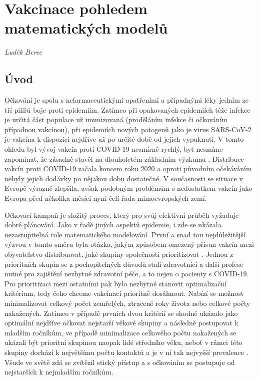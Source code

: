 \chapter{Vakcinace pohledem matematických modelů}
\label{Ucinnost_ockovani}

\textit{Luděk Berec}
\vspace{15mm}

\section*{Úvod}

Očkování je spolu s nefarmaceutickými opatřeními a případnými léky jedním ze tří pilířů boje proti epidemiím. Zatímco při opakovaných epidemiích téže infekce je určitá část populace už imunizovaná (proděláním infekce či očkováním případnou vakcínou), při epidemiích nových patogenů jako je virus SARS-CoV-2 je vakcína k dispozici nejdříve až po určité době od jejich vypuknutí. V tomto ohledu byl vývoj vakcín proti COVID-19 nesmírně rychlý, byť nesmíme zapomínat, že zásadně stavěl na dlouholetém základním výzkumu \cite{Pardi_etal2018}. Distribuce vakcín proti COVID-19 začala koncem roku 2020 a oproti původním očekáváním nebyly jejich dodávky po nějakou dobu dostatečné. V současnosti se situace v Evropě výrazně zlepšila, avšak podobným problémům s nedostatkem vakcín jako Evropa před několika měsíci nyní čelí řada mimoevropských zemí.

Očkovací kampaň je složitý proces, který pro svůj efektivní průběh vyžaduje dobré plánování. Jako v řadě jiných aspektů epidemie, i zde se ukázala nezastupitelná role matematického modelování. První a snad tou nejdůležitější výzvou v tomto směru byla otázka, jakým způsobem omezený přísun vakcín mezi obyvatelstvo distribuovat, jaké skupiny společnosti prioritizovat \cite{Bubar_etal2021,Moore_etal2021b}. Jednou z prioritních skupin se z pochopitelných důvodů stali zdravotníci a další profese nutné pro zajištění nezbytné zdravotní péče, a to nejen o pacienty s COVID-19. Pro prioritizaci mezi ostatními pak bylo nezbytné stanovit optimalizační kritérium, tedy čeho chceme vakcinací prioritně dosáhnout. Nabízí se možnost minimalizovat celkový počet zemřelých, ztracené roky života nebo celkové počty nakažených. Zatímco v případě prvních dvou kritérií se shodně ukázalo jako optimální nejdříve očkovat nejstarší věkové skupiny a následně postupovat k mladším ročníkům, ve případě minimalizace celkového počtu nakažených se ukázali být prioritní skupinou naopak lidé středního věku, neboť v rámci této skupiny dochází k největšímu počtu kontaktů a je v ní tak nejvyšší prevalence \cite{Bubar_etal2021,Moore_etal2021b}. Všude ve světě zdá se zvítězil etický přístup a s očkováním se postupuje od nejstarších k nejmladším ročníkům.

